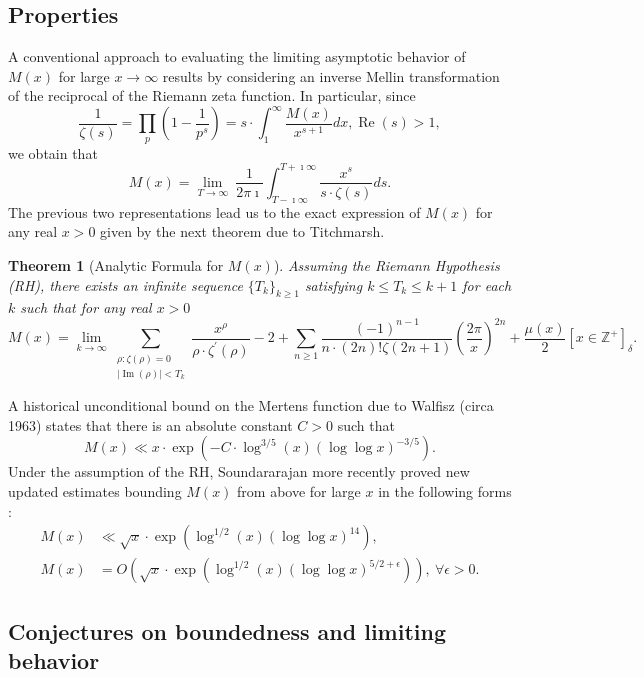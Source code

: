 \documentclass[11pt,reqno,a4letter]{article}
\numberwithin{figure}{section}
\numberwithin{table}{section}
\newcommand{\Iverson}[1]{\ensuremath{\left[#1\right]_{\delta}}}
\theoremstyle{plain}
\newtheorem{theorem}{Theorem}
\numberwithin{theorem}{section}
\theoremstyle{definition}
\renewcommand{\Re}{\operatorname{Re}}
\renewcommand{\Im}{\operatorname{Im}}
\begin{document}
\subsection{Properties} 

A conventional approach to evaluating the limiting asymptotic 
behavior of $M(x)$ for large $x \rightarrow \infty$ results by considering an 
inverse Mellin transformation of the reciprocal of the Riemann zeta function. 
In particular, since 
\[
\frac{1}{\zeta(s)} = \prod_{p} \left(1 - \frac{1}{p^s}\right) = 
     s \cdot \int_1^{\infty} \frac{M(x)}{x^{s+1}} dx, \Re(s) > 1, 
\]
we obtain that 
\[
M(x) = \lim_{T \rightarrow \infty}\ \frac{1}{2\pi\imath} \int_{T-\imath\infty}^{T+\imath\infty} 
     \frac{x^s}{s \cdot \zeta(s)} ds. 
\] 
The previous two representations lead us to the 
exact expression of $M(x)$ for any real $x > 0$ 
given by the next theorem due to Titchmarsh. 
\nocite{TITCHMARSH} 

\begin{theorem}[Analytic Formula for $M(x)$] 
\label{theorem_MxMellinTransformInvFormula} 
Assuming the Riemann Hypothesis (RH), there exists an infinite sequence 
$\{T_k\}_{k \geq 1}$ satisfying $k \leq T_k \leq k+1$ for each $k$ 
such that for any real $x > 0$ 
\[
M(x) = \lim_{k \rightarrow \infty} 
     \sum_{\substack{\rho: \zeta(\rho) = 0 \\ |\Im(\rho)| < T_k}} 
     \frac{x^{\rho}}{\rho \cdot \zeta^{\prime}(\rho)} - 2 + 
     \sum_{n \geq 1} \frac{(-1)^{n-1}}{n \cdot (2n)! \zeta(2n+1)} 
     \left(\frac{2\pi}{x}\right)^{2n} + 
     \frac{\mu(x)}{2} \Iverson{x \in \mathbb{Z}^{+}}. 
\] 
\end{theorem} 

A historical unconditional bound on the Mertens function due to Walfisz (circa 1963) 
states that there is an absolute constant $C > 0$ such that 
$$M(x) \ll x \cdot \exp\left(-C \cdot \log^{3/5}(x) 
  (\log\log x)^{-3/5}\right).$$ 
Under the assumption of the RH, Soundararajan more recently proved new updated estimates 
bounding $M(x)$ from above for large $x$ in the following forms \cite{SOUND-MERTENS-ANNALS}: 
\begin{align*} 
M(x) & \ll \sqrt{x} \cdot \exp\left(\log^{1/2}(x) (\log\log x)^{14}\right), \\ 
M(x) & = O\left(\sqrt{x} \cdot \exp\left( 
     \log^{1/2}(x) (\log\log x)^{5/2+\epsilon}\right)\right),\ 
     \forall \epsilon > 0. 
\end{align*} 

\subsection{Conjectures on boundedness and limiting behavior} 
\end{document}
